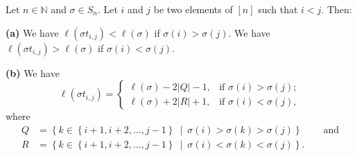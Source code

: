 \begin{proposition}
\label{prop.perm.lisitij}Let $n\in\mathbb{N}$ and $\sigma\in S_{n}$. Let $i$
and $j$ be two elements of $\left[  n\right]  $ such that $i<j$. Then:
\medskip

\textbf{(a)} We have $\ell\left(  \sigma t_{i,j}\right)  <\ell\left(
\sigma\right)  $ if $\sigma\left(  i\right)  >\sigma\left(  j\right)  $. We
have $\ell\left(  \sigma t_{i,j}\right)  >\ell\left(  \sigma\right)  $ if
$\sigma\left(  i\right)  <\sigma\left(  j\right)  $. \medskip

\textbf{(b)} We have%
\[
\ell\left(  \sigma t_{i,j}\right)  =%
\begin{cases}
\ell\left(  \sigma\right)  -2\left\vert Q\right\vert -1, & \text{if }%
\sigma\left(  i\right)  >\sigma\left(  j\right)  ;\\
\ell\left(  \sigma\right)  +2\left\vert R\right\vert +1, & \text{if }%
\sigma\left(  i\right)  <\sigma\left(  j\right)  ,
\end{cases}
\]
where
\begin{align*}
Q  &  =\left\{  k\in\left\{  i+1,i+2,\ldots,j-1\right\}  \ \mid\ \sigma\left(
i\right)  >\sigma\left(  k\right)  >\sigma\left(  j\right)  \right\}
\ \ \ \ \ \ \ \ \ \ \text{and}\\
R  &  =\left\{  k\in\left\{  i+1,i+2,\ldots,j-1\right\}  \ \mid\ \sigma\left(
i\right)  <\sigma\left(  k\right)  <\sigma\left(  j\right)  \right\}  .
\end{align*}

\end{proposition}

